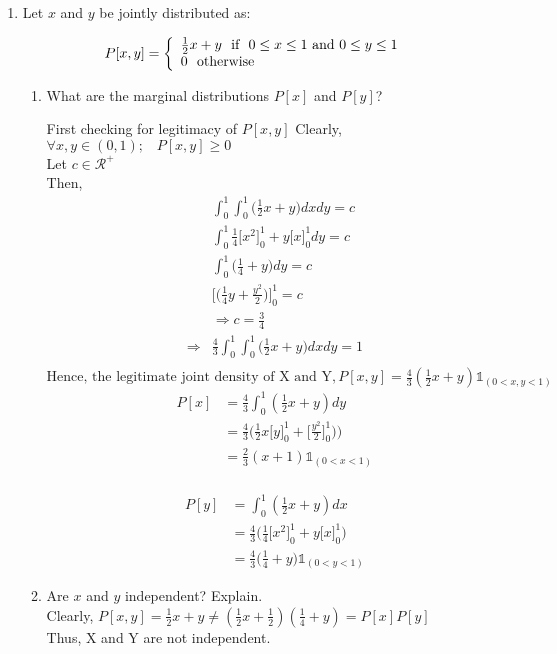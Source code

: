 \documentclass[
  12pt,
]{article}
\begin{document}
\begin{enumerate}
\item Let $x$ and $y$ be jointly distributed as:

\begin{align}
P[x,y]=  \left\{ \begin{array}{l l} 
        \frac{1}{2}x+y \ \text{ if } \ 0\leq x \leq 1 \text{ and } 0\leq y \leq 1
        &\\
        0 \ \text{ otherwise }
    \end{array} \right.
\end{align}

\begin{enumerate}
\item What are the marginal distributions $P[x]$ and $P[y]$?
{
\color{blue}
First checking for legitimacy of $P[x, y]$
Clearly, $\forall x, y \in (0,1); \;\;\; P[x,y] \ge 0$\\
Let $c \in \mathcal{R}^{+}$\\
Then,
$$\begin{aligned}
&\int_{0}^{1} \int_{0}^{1} \Big(\frac{1}{2}x+y\Big)dxdy = c\\
&\int_{0}^{1}\frac{1}{4}\Big[x^2\Big]_0^1+y\Big[x\Big]_0^1dy = c\\
&\int_{0}^{1}\Big(\frac{1}{4} + y\Big)dy = c\\
&\Big[\Big(\frac{1}{4}y + \frac{y^2}{2}\Big)\Big]_{0}^{1} = c\\
&\Rightarrow c = \frac{3}{4}\\
\Rightarrow &\frac{4}{3}\int_{0}^{1} \int_{0}^{1}\Big(\frac{1}{2}x+y\Big)dxdy = 1\\
\end{aligned}$$
$\text{Hence, the legitimate joint density of X and Y}, P[x, y] =\frac{4}{3}(\frac{1}{2}x+y)\mathbb{1}_{(0 <x, y<1)}$\\

$$\begin{aligned}
P[x] &= \frac{4}{3}\int_{0}^{1}(\frac{1}{2}x+y)dy\\
&= \frac{4}{3}\Big(\frac{1}{2}x\Big[y\Big]_0^1+\Big[\frac{y^2}{2}\Big]_0^1)\Big)\\
&= \frac{2}{3}(x+1)\mathbb{1}_{(0 < x<1)}\\
\end{aligned}$$

$$\begin{aligned}
P[y] &= \int_{0}^{1}(\frac{1}{2}x+y)dx\\
&= \frac{4}{3}\Big(\frac{1}{4}\Big[x^2\Big]_0^1+y\Big[x\Big]_0^1\Big)\\
&= \frac{4}{3}\Big(\frac{1}{4} + y\Big)\mathbb{1}_{(0 < y<1)}
\end{aligned}$$
}
\item Are $x$ and $y$ independent? Explain. \\
{
\color{blue}
Clearly,
$P[x,y] = \frac{1}{2}x+y \ne (\frac{1}{2}x+\frac{1}{2})(\frac{1}{4} + y) = P[x]P[y]$\\
Thus, X and Y are not independent.
}
\end{enumerate}


\end{enumerate}
\end{document}
